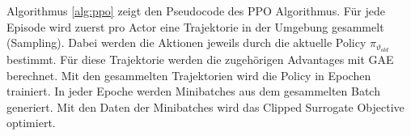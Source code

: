 Algorithmus \ref{alg:ppo} zeigt den Pseudocode des PPO Algorithmus. Für jede Episode wird zuerst pro Actor eine Trajektorie in der Umgebung gesammelt (Sampling). Dabei werden die Aktionen jeweils durch die aktuelle Policy $\pi_{\vartheta_{old}}$ bestimmt. Für diese Trajektorie werden die zugehörigen Advantages mit GAE berechnet. 
Mit den gesammelten Trajektorien wird die Policy in Epochen trainiert. In jeder Epoche werden Minibatches aus dem gesammelten Batch generiert. Mit den Daten der Minibatches wird das Clipped Surrogate Objective optimiert.